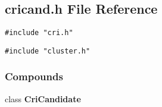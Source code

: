 \subsection{cricand.h File Reference}
\label{cricand.h}
{\tt \#include "cri.h"}\par
{\tt \#include "cluster.h"}\par
\subsubsection*{Compounds}
\begin{CompactItemize}
\item 
class {\bf Cri\-Candidate}
\end{CompactItemize}
